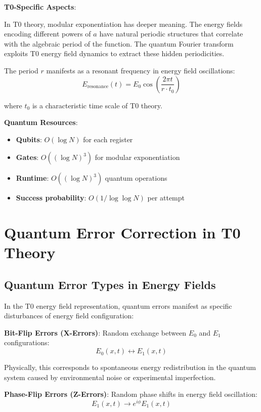 \documentclass[12pt,a4paper]{article}
\theoremstyle{definition}
\theoremstyle{remark}
\begin{document}
	\textbf{T0-Specific Aspects}:
	
	In T0 theory, modular exponentiation has deeper meaning. The energy fields encoding different powers of $a$ have natural periodic structures that correlate with the algebraic period of the function. The quantum Fourier transform exploits T0 energy field dynamics to extract these hidden periodicities.
	
	The period $r$ manifests as a resonant frequency in energy field oscillations:
	\begin{equation}
		E_{\text{resonance}}(t) = E_0 \cos\left(\frac{2\pi t}{r \cdot t_0}\right)
	\end{equation}
	
	where $t_0$ is a characteristic time scale of T0 theory.
	
	\textbf{Quantum Resources}:
	\begin{itemize}
		\item \textbf{Qubits}: $O(\log N)$ for each register
		\item \textbf{Gates}: $O((\log N)^3)$ for modular exponentiation
		\item \textbf{Runtime}: $O((\log N)^3)$ quantum operations
		\item \textbf{Success probability}: $O(1/\log \log N)$ per attempt
	\end{itemize}
	
	\section{Quantum Error Correction in T0 Theory}
	
	\subsection{Quantum Error Types in Energy Fields}
	
	In the T0 energy field representation, quantum errors manifest as specific disturbances of energy field configuration:
	
	\textbf{Bit-Flip Errors (X-Errors)}:
	Random exchange between $E_0$ and $E_1$ configurations:
	\begin{equation}
		E_0(x,t) \leftrightarrow E_1(x,t)
	\end{equation}
	
	Physically, this corresponds to spontaneous energy redistribution in the quantum system caused by environmental noise or experimental imperfection.
	
	\textbf{Phase-Flip Errors (Z-Errors)}:
	Random phase shifts in energy field oscillation:
	\begin{equation}
		E_1(x,t) \rightarrow e^{i\phi} E_1(x,t)
	\end{equation}
	
\end{document}
